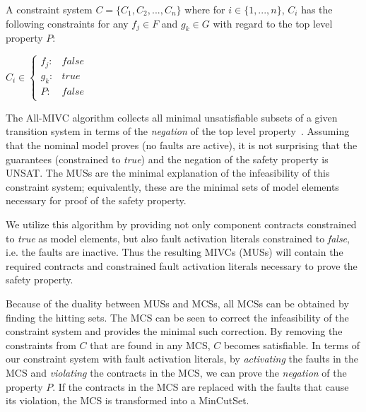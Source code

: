 \begin{definition}A constraint system $C = \{C_1,C_2,...,C_n\}$ where for $i \in \{1,...,n\}$, $C_i$ has the following constraints for any $f_j \in F$ and $g_k \in G$ with regard to the top level property $P$: 
\begin{center}
$C_i \in \left\{ \begin{array}{ll}
	f_j :&  false\\
	g_k :& true\\
	P :& false\\
\end{array}\right.$	
\end{center}
\label{def:constraintsystem}
\end{definition}

The All-MIVC algorithm collects all minimal unsatisfiable subsets of a given transition system in terms of the \textit{negation} of the top level property~\cite{Ghassabani2017EfficientGO,bendik2018online}. Assuming that the nominal model proves (no faults are active), it is not surprising that the guarantees (constrained to \textit{true}) and the negation of the safety property is UNSAT. The MUSs are the minimal explanation of the infeasibility of this constraint system; equivalently, these are the minimal sets of model elements necessary for proof of the safety property.

We utilize this algorithm by providing not only component contracts constrained to \textit{true} as model elements, but also fault activation literals constrained to \textit{false}, i.e. the faults are inactive. Thus the resulting MIVCs (MUSs) will contain the required contracts and constrained fault activation literals necessary to prove the safety property. 

Because of the duality between MUSs and MCSs, all MCSs can be obtained by finding the hitting sets. The MCS can be seen to correct the infeasibility of the constraint system and provides the minimal such correction. By removing the constraints from $C$ that are found in any MCS, $C$ becomes satisfiable. In terms of our constraint system with fault activation literals, by \textit{activating} the faults in the MCS and \textit{violating} the contracts in the MCS, we can prove the \textit{negation} of the property $P$. If the contracts in the MCS are replaced with the faults that cause its violation, the MCS is transformed into a MinCutSet.\\

